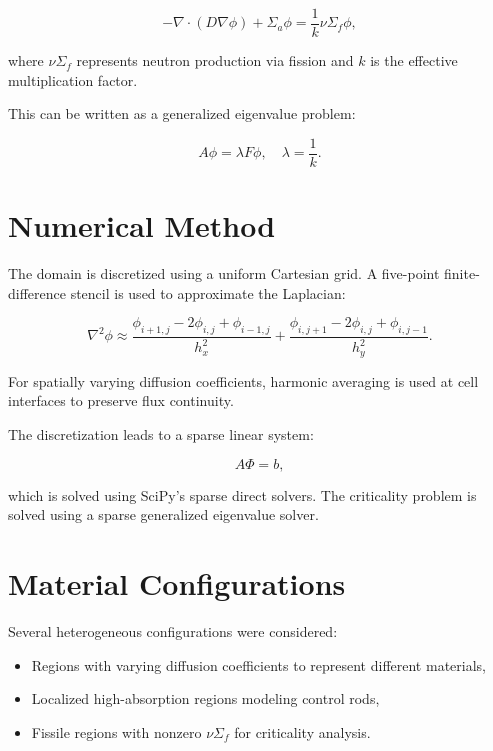 \documentclass[11pt]{article}
\begin{document}
\begin{equation}
- \nabla \cdot (D \nabla \phi) + \Sigma_a \phi = \frac{1}{k} \nu \Sigma_f \phi,
\end{equation}

where $\nu \Sigma_f$ represents neutron production via fission and $k$ is the effective multiplication factor.

This can be written as a generalized eigenvalue problem:

\begin{equation}
A \phi = \lambda F \phi, \quad \lambda = \frac{1}{k}.
\end{equation}

\section{Numerical Method}

The domain is discretized using a uniform Cartesian grid. A five-point finite-difference stencil is used to approximate the Laplacian:

\begin{equation}
\nabla^2 \phi \approx \frac{\phi_{i+1,j} - 2\phi_{i,j} + \phi_{i-1,j}}{h_x^2}
+ \frac{\phi_{i,j+1} - 2\phi_{i,j} + \phi_{i,j-1}}{h_y^2}.
\end{equation}

For spatially varying diffusion coefficients, harmonic averaging is used at cell interfaces to preserve flux continuity.

The discretization leads to a sparse linear system:

\begin{equation}
A \Phi = b,
\end{equation}

which is solved using SciPy's sparse direct solvers. The criticality problem is solved using a sparse generalized eigenvalue solver.

\section{Material Configurations}

Several heterogeneous configurations were considered:
\begin{itemize}
    \item Regions with varying diffusion coefficients to represent different materials,
    \item Localized high-absorption regions modeling control rods,
    \item Fissile regions with nonzero $\nu \Sigma_f$ for criticality analysis.
\end{itemize}
\end{document}
